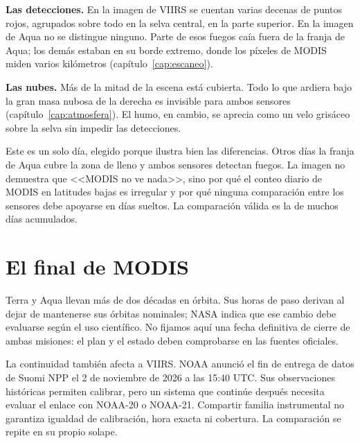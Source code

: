 \textbf{Las detecciones.} En la imagen de VIIRS se cuentan varias decenas de puntos rojos,
agrupados sobre todo en la selva central, en la parte superior. En la imagen de Aqua no se
distingue ninguno. Parte de esos fuegos caía fuera de la franja de Aqua; los demás estaban en su
borde extremo, donde los píxeles de MODIS miden varios kilómetros
(capítulo~\ref{cap:escaneo}).

\textbf{Las nubes.} Más de la mitad de la escena está cubierta. Todo lo que ardiera bajo la gran
masa nubosa de la derecha es invisible para ambos sensores (capítulo~\ref{cap:atmosfera}). El
humo, en cambio, se aprecia como un velo grisáceo sobre la selva sin impedir las detecciones.

\begin{atencion}
Este es un solo día, elegido porque ilustra bien las diferencias. Otros días la franja de Aqua
cubre la zona de lleno y ambos sensores detectan fuegos. La imagen no demuestra que <<MODIS no
ve nada>>, sino por qué el conteo diario de MODIS en latitudes bajas es irregular y por qué
ninguna comparación entre los sensores debe apoyarse en días sueltos. La comparación válida es
la de muchos días acumulados.
\end{atencion}

\section{El final de MODIS}

Terra y Aqua llevan más de dos décadas en órbita. Sus horas de paso derivan al dejar
de mantenerse sus órbitas nominales; NASA indica que ese cambio debe evaluarse según
el uso científico. No fijamos aquí una fecha definitiva de cierre de ambas misiones:
el plan y el estado deben comprobarse en las fuentes oficiales.

La continuidad también afecta a VIIRS. NOAA anunció el fin de entrega de datos de
Suomi NPP el 2 de noviembre de 2026 a las 15:40 UTC. Sus observaciones
históricas permiten calibrar, pero un sistema que continúe después necesita evaluar
el enlace con NOAA-20 o NOAA-21. Compartir familia instrumental no garantiza igualdad
de calibración, hora exacta ni cobertura. La comparación se repite en su propio solape.

\resumen

